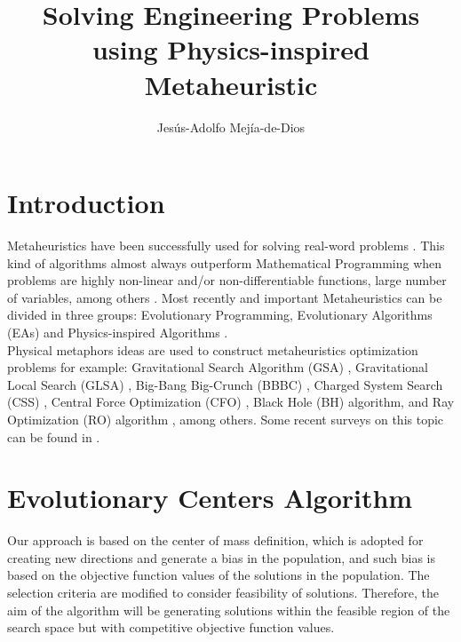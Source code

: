 \documentclass[12pt,letterpape]{article}
\title{Solving Engineering Problems using Physics-inspired Metaheuristic}
\author{Jesús-Adolfo Mejía-de-Dios}
\begin{document}
\maketitle

\section{Introduction} %
\label{sec:introduction}

Metaheuristics have been successfully used for solving real-word problems \cite{easSurv}.
This kind of algorithms almost always outperform Mathematical Programming when problems
are highly non-linear and/or non-differentiable functions, large number of variables, 
among others \cite{problemas}. Most recently and important Metaheuristics can be divided in three
groups: Evolutionary Programming, Evolutionary Algorithms (EAs) and Physics-inspired
Algorithms \cite{biswas2013physics, easSurv, DBLP:journals/corr/FisterYFBF13,spall03}.\\

Physical metaphors ideas are used to construct metaheuristics optimization problems
for example: Gravitational  Search Algorithm (GSA) \cite{rashedi2009gsa}, 
Gravitational Local Search (GLSA) \cite{glsa}, Big-Bang Big-Crunch (BBBC) \cite{erol2006new}, 
Charged System Search (CSS) \cite{kaveh2010novel}, Central Force Optimization 
(CFO) \cite{cfo2007}, Black Hole (BH) \cite{hatamlou2013black} algorithm, and Ray 
Optimization (RO) algorithm \cite{kaveh2012new}, among others. Some recent surveys 
on this topic can be found in
\cite{fisicaSurvey,biswas2013physics,DBLP:journals/corr/FisterYFBF13,xie2011convergence}. 

% 
\section{Evolutionary Centers Algorithm} %
\label{sec:evolutionary_centers_algorithm}

Our approach is based on the center of mass definition, which is adopted for 
creating new directions and generate a bias in the population, and such bias is 
based on the objective function values of the solutions in the population. The 
selection criteria are modified to consider feasibility of solutions. Therefore, 
the aim of the algorithm will be generating solutions within the feasible region 
of the search space but with competitive objective function values.

%
%
\end{document}

